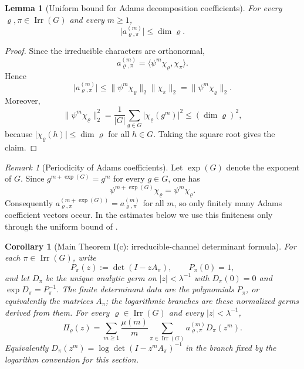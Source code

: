 \documentclass[11pt,a4paper]{amsart}
\theoremstyle{plain}
\newtheorem{corollary}[theorem]{Corollary}
\newtheorem{lemma}[theorem]{Lemma}
\theoremstyle{definition}
\theoremstyle{remark}
\newtheorem{remark}[theorem]{Remark}
\DeclareMathOperator{\Irr}{Irr}
\newcommand{\abs}[1]{\lvert #1 \rvert}
\newcommand{\norm}[1]{\lVert #1 \rVert}
\begin{document}
\begin{lemma}[Uniform bound for Adams decomposition coefficients]
  \label{lem:adams-coefficients-bounded}
  For every \(\varrho,\pi\in\Irr(G)\) and every \(m\ge 1\),
  \[
    \abs{a_{\varrho,\pi}^{(m)}}\le \dim\varrho.
  \]
\end{lemma}

\begin{proof}
  Since the irreducible characters are orthonormal,
  \[
    a_{\varrho,\pi}^{(m)}
    =\langle \psi^m\chi_\varrho,\chi_\pi\rangle.
  \]
  Hence
  \[
    \abs{a_{\varrho,\pi}^{(m)}}
    \le \norm{\psi^m\chi_\varrho}_2\norm{\chi_\pi}_2
    =\norm{\psi^m\chi_\varrho}_2.
  \]
  Moreover,
  \[
    \norm{\psi^m\chi_\varrho}_2^2
    =\frac{1}{|G|}\sum_{g\in G}\abs{\chi_\varrho(g^m)}^2
    \le (\dim\varrho)^2,
  \]
  because \(\abs{\chi_\varrho(h)}\le \dim\varrho\) for all \(h\in G\).
  Taking the square root gives the claim.
\end{proof}

\begin{remark}[Periodicity of Adams coefficients]
  \label{rem:adams-coefficients-periodic}
  Let \(\exp(G)\) denote the exponent of \(G\). Since
  \(g^{m+\exp(G)}=g^m\) for every \(g\in G\), one has
  \[
    \psi^{m+\exp(G)}\chi_\varrho=\psi^m\chi_\varrho.
  \]
  Consequently
  \(a_{\varrho,\pi}^{(m+\exp(G))}=a_{\varrho,\pi}^{(m)}\) for all
  \(m\), so only finitely many Adams coefficient vectors occur. In the
  estimates below we use this finiteness only through the uniform bound
  of .
\end{remark}

\begin{corollary}[Main Theorem I(c): irreducible-channel determinant
  formula]
  \label{cor:primitive-peter-weyl-determinant}
  For each \(\pi\in\Irr(G)\), write
  \[
    P_\pi(z):=\det(I-zA_\pi),\qquad P_\pi(0)=1,
  \]
  and let \(D_\pi\) be the unique analytic germ on
  \(|z|<\lambda^{-1}\) with \(D_\pi(0)=0\) and
  \(\exp D_\pi=P_\pi^{-1}\). The finite determinant data are the
  polynomials \(P_\pi\), or equivalently the matrices \(A_\pi\); the
  logarithmic branches are these normalized germs derived from them.
  For every \(\varrho\in\Irr(G)\) and every \(|z|<\lambda^{-1}\),
  \begin{equation}\label{eq:primitive-peter-weyl-determinant}
    \Pi_\varrho(z)
    =
    \sum_{m\ge 1}\frac{\mu(m)}{m}
      \sum_{\pi\in\Irr(G)}
        a_{\varrho,\pi}^{(m)}
        D_\pi(z^m).
  \end{equation}
  Equivalently \(D_\pi(z^m)=\log\det(I-z^mA_\pi)^{-1}\) in the branch
  fixed by the logarithm convention for this section.
\end{corollary}
\end{document}

